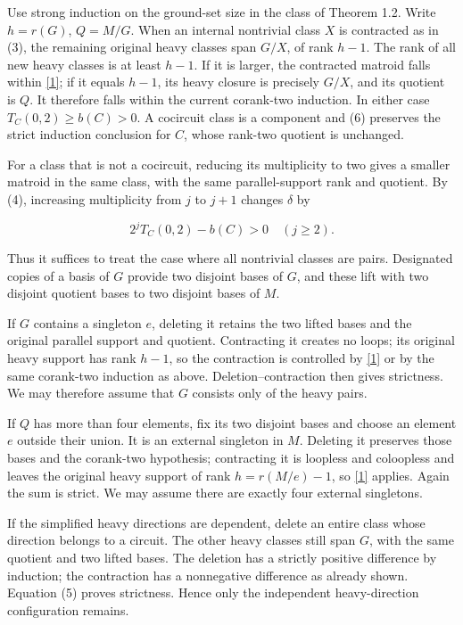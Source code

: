 \documentclass[11pt]{article}
\begin{document}
Use strong induction on the ground-set size in the class of Theorem 1.2. Write \(h=r(G)\), \(Q=M/G\). When an internal nontrivial class \(X\) is contracted as in (3), the remaining original heavy classes span \(G/X\), of rank \(h-1\). The rank of all new heavy classes is at least \(h-1\). If it is larger, the contracted matroid falls within \hyperlink{ref1}{[1]}; if it equals \(h-1\), its heavy closure is precisely \(G/X\), and its quotient is \(Q\). It therefore falls within the current corank-two induction. In either case \(T_C(0,2)\ge b(C)>0\). A cocircuit class is a component and (6) preserves the strict induction conclusion for \(C\), whose rank-two quotient is unchanged.

For a class that is not a cocircuit, reducing its multiplicity to two gives a smaller matroid in the same class, with the same parallel-support rank and quotient. By (4), increasing multiplicity from \(j\) to \(j+1\) changes \(\delta\) by

\[
2^j T_C(0,2)-b(C)>0\quad(j\ge2). \tag{10}
\]

Thus it suffices to treat the case where all nontrivial classes are pairs. Designated copies of a basis of \(G\) provide two disjoint bases of \(G\), and these lift with two disjoint quotient bases to two disjoint bases of \(M\).

If \(G\) contains a singleton \(e\), deleting it retains the two lifted bases and the original parallel support and quotient. Contracting it creates no loops; its original heavy support has rank \(h-1\), so the contraction is controlled by \hyperlink{ref1}{[1]} or by the same corank-two induction as above. Deletion--contraction then gives strictness. We may therefore assume that \(G\) consists only of the heavy pairs.

If \(Q\) has more than four elements, fix its two disjoint bases and choose an element \(e\) outside their union. It is an external singleton in \(M\). Deleting it preserves those bases and the corank-two hypothesis; contracting it is loopless and coloopless and leaves the original heavy support of rank \(h=r(M/e)-1\), so \hyperlink{ref1}{[1]} applies. Again the sum is strict. We may assume there are exactly four external singletons.

If the simplified heavy directions are dependent, delete an entire class whose direction belongs to a circuit. The other heavy classes still span \(G\), with the same quotient and two lifted bases. The deletion has a strictly positive difference by induction; the contraction has a nonnegative difference as already shown. Equation (5) proves strictness. Hence only the independent heavy-direction configuration remains.
\end{document}

